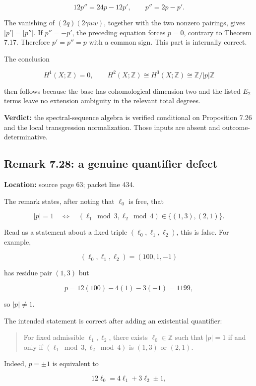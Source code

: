 \documentclass[
  10pt,
]{article}
\begin{document}
\[
12p''=24p-12p',\qquad p''=2p-p'.
\]

The vanishing of \((2q)(2\gamma uw)\), together with the two nonzero
pairings, gives \(|p'|=|p''|\). If \(p''=-p'\), the preceding equation
forces \(p=0\), contrary to Theorem 7.17. Therefore \(p'=p''=p\) with a
common sign. This part is internally correct.

The conclusion

\[
H^1(X;\mathbb Z)=0,
\qquad H^2(X;\mathbb Z)\cong H^3(X;\mathbb Z)
 \cong\mathbb Z/|p|\mathbb Z
\]

then follows because the base has cohomological dimension two and the
listed \(E_2\) terms leave no extension ambiguity in the relevant total
degrees.

\textbf{Verdict:} the spectral-sequence algebra is verified conditional
on Proposition 7.26 and the local transgression normalization. Those
inputs are absent and outcome-determinative.

\subsection{Remark 7.28: a genuine quantifier
defect}\label{remark-7.28-a-genuine-quantifier-defect}

\textbf{Location:} source page 63; packet line 434.

The remark states, after noting that \(\ell_0\) is free, that

\[
|p|=1
\quad\Longleftrightarrow\quad
(\ell_1\bmod3,\ell_2\bmod4)\in\{(1,3),(2,1)\}.
\]

Read as a statement about a fixed triple \((\ell_0,\ell_1,\ell_2)\),
this is false. For example,

\[
(\ell_0,\ell_1,\ell_2)=(100,1,-1)
\]

has residue pair \((1,3)\) but

\[
p=12(100)-4(1)-3(-1)=1199,
\]

so \(|p|\ne1\).

The intended statement is correct after adding an existential
quantifier:

\begin{quote}
For fixed admissible \(\ell_1,\ell_2\), there exists
\(\ell_0\in\mathbb Z\) such that \(|p|=1\) if and only if
\((\ell_1\bmod3,\ell_2\bmod4)\) is \((1,3)\) or \((2,1)\).
\end{quote}

Indeed, \(p=\pm1\) is equivalent to

\[
12\ell_0=4\ell_1+3\ell_2\pm1,
\]
\end{document}
